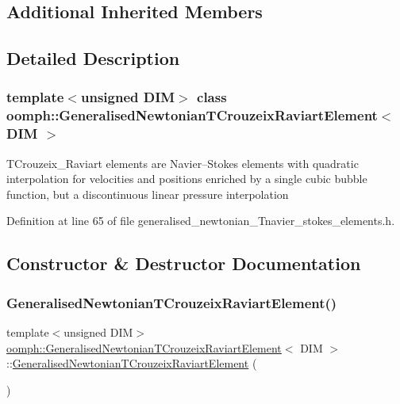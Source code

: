 \subsection*{Additional Inherited Members}


\subsection{Detailed Description}
\subsubsection*{template$<$unsigned D\+IM$>$\newline
class oomph\+::\+Generalised\+Newtonian\+T\+Crouzeix\+Raviart\+Element$<$ D\+I\+M $>$}

T\+Crouzeix\+\_\+\+Raviart elements are Navier--Stokes elements with quadratic interpolation for velocities and positions enriched by a single cubic bubble function, but a discontinuous linear pressure interpolation 

Definition at line 65 of file generalised\+\_\+newtonian\+\_\+\+Tnavier\+\_\+stokes\+\_\+elements.\+h.



\subsection{Constructor \& Destructor Documentation}
\mbox{\label{classoomph_1_1GeneralisedNewtonianTCrouzeixRaviartElement_ad69c2f4ea7c8eb81dfc5bce1bb709092}} 
\subsubsection{\texorpdfstring{Generalised\+Newtonian\+T\+Crouzeix\+Raviart\+Element()}{GeneralisedNewtonianTCrouzeixRaviartElement()}\hspace{0.1cm}{\footnotesize\ttfamily [1/2]}}
{\footnotesize\ttfamily template$<$unsigned D\+IM$>$ \\
\hyperlink{classoomph_1_1GeneralisedNewtonianTCrouzeixRaviartElement}{oomph\+::\+Generalised\+Newtonian\+T\+Crouzeix\+Raviart\+Element}$<$ D\+IM $>$\+::\hyperlink{classoomph_1_1GeneralisedNewtonianTCrouzeixRaviartElement}{Generalised\+Newtonian\+T\+Crouzeix\+Raviart\+Element} (\begin{DoxyParamCaption}{ }\end{DoxyParamCaption})\hspace{0.3cm}{\ttfamily [inline]}}



